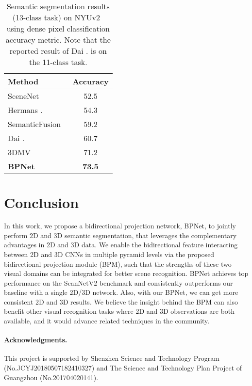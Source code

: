 \documentclass[final]{cvpr}
\begin{document}
\begin{table}[!t]
\centering
	\renewcommand{\tabcolsep}{12pt}
\begin{tabular}{l|c}
		\toprule[1pt] 
		Method                             &    Accuracy      \\ \hline
		SceneNet~\cite{handa2015scenenet} & 52.5 \\
		Hermans \etal.~\cite{hermans2014dense} & 54.3 \\
		SemanticFusion~\cite{mccormac2017semanticfusion} & 59.2 \\
		Dai \etal.~\cite{dai2017scannet} & 60.7 \\
		3DMV~\cite{dai20183dmv} & 71.2 \\
		\textbf{BPNet}                     & \textbf{73.5}  \\    \bottomrule[1pt]
	\end{tabular}
\vspace{1mm}
	\caption{Semantic segmentation results (13-class task) on NYUv2~\cite{Silberman:ECCV12} using dense pixel classification accuracy metric. Note that the reported result of Dai \etal. is on the 11-class task.}
	\vspace{-4.5mm}
	\label{tab:nyu}
\end{table}














 
\section{Conclusion}
\label{sec:conclusion}
In this work, we propose a bidirectional projection network, BPNet, to jointly perform 2D and 3D semantic segmentation, that leverages the complementary advantages in 2D and 3D data.
We enable the bidirectional feature interacting between 2D and 3D CNNs in multiple pyramid levels via the proposed bidirectional projection module (BPM), such that the strengths of these two visual domains can be integrated for better scene recognition.
BPNet achieves top performance on the ScanNetV2 benchmark and consistently outperforms our baseline with a single 2D/3D network. Also, with our BPNet, we can get more consistent 2D and 3D results. 
We believe the insight behind the BPM can also benefit other visual recognition tasks where 2D and 3D observations are both available, and it would advance related techniques in the community.

\paragraph{Acknowledgments.}
This project is supported by Shenzhen Science and Technology Program (No.JCYJ20180507182410327) and The Science and Technology Plan Project of Guangzhou (No.201704020141).

{\small
	
	
}
\end{document}
